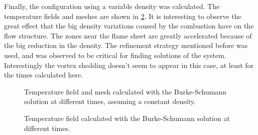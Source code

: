 Finally, the configuration using a variable density was calculated. The temperature fields and meshes are shown in \cref{fig:CombustionOverCylinder}. It is interesting to observe the great effect that the big density variations caused by the combustion have on the flow structure. The zones near the flame sheet are greatly accelerated because of the big reduction in the density. The refinement strategy mentioned before was used, and was observed to be critical for finding solutions of the system.
Interestingly the vortex shedding doesn't seem to appear in this case, at least for the times calculated here. 




\begin{figure}[p]
	\centering
	\par\bigskip%
	\par\bigskip%
	\caption{Temperature field and mesh calculated with the Burke-Schumann solution at different times, assuming a constant density.} \label{fig:CombustionOverCylinder_CD}
\end{figure}


\begin{figure}[p]
	\centering
	\par\bigskip%
	\par\bigskip%
	\caption{Temperature field calculated with the Burke-Schumann solution at different times.} \label{fig:CombustionOverCylinder}
\end{figure}

